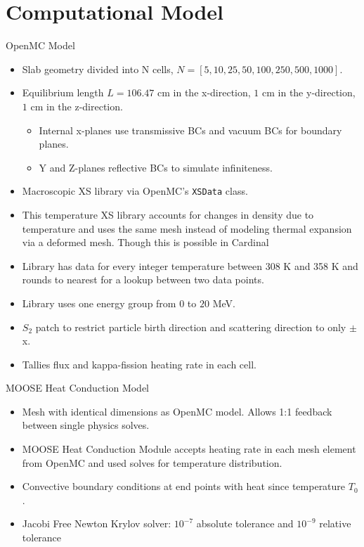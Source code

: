 \documentclass[9pt,t]{beamer}
\begin{document}
\section{Computational Model}
\begin{frame}{OpenMC Model}
    \pause
    \begin{itemize}
        \item<2->Slab geometry divided into N cells, $N=[5, 10, 25, 50, 100, 250, 500, 1000]$.
        \item<3-> Equilibrium length $L=106.47$ cm in the x-direction, $1$ cm in the y-direction, $1$ cm in the z-direction.
        \begin{itemize}
            \item<4-> Internal x-planes use transmissive BCs and vacuum BCs for boundary planes.
            \item<5-> Y and Z-planes reflective BCs to simulate infiniteness.
        \end{itemize}
        \item<6-> Macroscopic XS library via OpenMC's \texttt{XSData} class.
        \item<7-> This temperature XS library accounts for changes in density due to temperature and uses the same mesh instead of modeling thermal expansion via a deformed mesh. Though this is possible in Cardinal \cite{novak-2023}
        \item<8-> Library has data for every integer temperature between 308 K and 358 K and rounds to nearest for a lookup between two data points.
        \item<9-> Library uses one energy group from $0$ to $20$ MeV.
        \item<10-> $S_{2}$ patch to restrict particle birth direction and scattering direction to only $\pm$x.
        \item<11->Tallies flux and kappa-fission heating rate in each cell.
    \end{itemize}
\end{frame}

\begin{frame}{MOOSE Heat Conduction Model}
    \begin{itemize}
        \item Mesh with identical dimensions as OpenMC model. Allows 1:1 feedback between single physics solves.
        \item MOOSE Heat Conduction Module accepts heating rate in each mesh element from OpenMC and used solves for temperature distribution.
        \item Convective boundary conditions at end points with heat since temperature $T_{0}$.
        \item Jacobi Free Newton Krylov solver: $10^{-7}$ absolute tolerance and $10^{-9}$ relative tolerance
    \end{itemize}
\end{frame}
\end{document}
